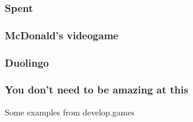 \documentclass{beamer}
\begin{document}
\begin{frame}
\frametitle{Spent}
\begin{figure}
\end{figure}
\end{frame}
\begin{frame}
\frametitle{McDonald's videogame}
\begin{figure}
\end{figure}
\end{frame}
\begin{frame}
\frametitle{Duolingo}
\begin{figure}
\end{figure}
\end{frame}

\begin{frame}
\frametitle{You don't need to be amazing at this}
Some examples from develop.games
\end{frame}
\end{document}
